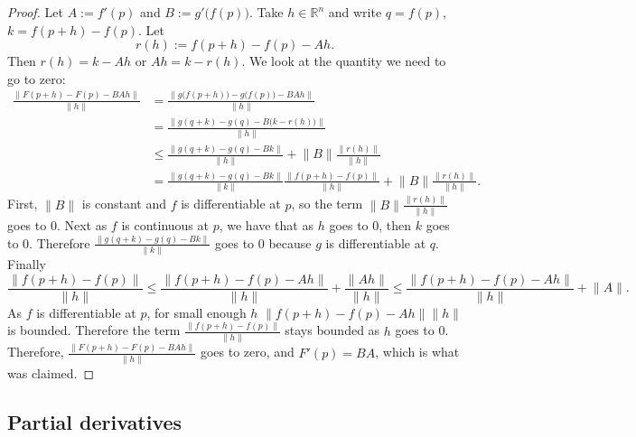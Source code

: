 \documentclass[12pt]{book}
\newcommand{\snorm}[1]{\lVert {#1} \rVert}
\newcommand{\R}{{\mathbb{R}}}
\theoremstyle{plain}
\theoremstyle{remark}
\theoremstyle{definition}
\theoremstyle{exercise}
\theoremstyle{example}
\begin{document}
\begin{proof}
Let $A := f'(p)$ and $B := g'\bigl(f(p)\bigr)$.  Take $h \in \R^n$
and write $q = f(p)$, $k = f(p+h)-f(p)$.  Let
\begin{equation*}
r(h) := f(p+h)-f(p) - A h . %
\end{equation*}
Then $r(h) = k-Ah$ or $Ah = k-r(h)$.  We look at the quantity we need to go
to zero:
\begin{equation*}
\begin{split}
\frac{\snorm{F(p+h)-F(p) - BAh}}{\snorm{h}}
& =
\frac{\snorm{g\bigl(f(p+h)\bigr)-g\bigl(f(p)\bigr) - BAh}}{\snorm{h}}
\\
& =
\frac{\snorm{g(q+k)-g(q) - B\bigl(k-r(h)\bigr)}}{\snorm{h}}
\\
& \leq
\frac
{\snorm{g(q+k)-g(q) - Bk}}
{\snorm{h}}
+
\snorm{B}
\frac
{\snorm{r(h)}}
{\snorm{h}}
\\
& =
\frac
{\snorm{g(q+k)-g(q) - Bk}}
{\snorm{k}}
\frac
{\snorm{f(p+h)-f(p)}}
{\snorm{h}}
+
\snorm{B}
\frac
{\snorm{r(h)}}
{\snorm{h}} .
\end{split}
\end{equation*}
First, $\snorm{B}$ is constant and $f$ is differentiable at $p$,
so
the term $\snorm{B}\frac{\snorm{r(h)}}{\snorm{h}}$ goes to 0.
Next as $f$ is continuous at $p$, we have that as 
$h$ goes to 0, then $k$ goes to 0.  Therefore
$\frac
{\snorm{g(q+k)-g(q) - Bk}}
{\snorm{k}}$ goes to 0 because $g$ is differentiable at $q$.
Finally 
\begin{equation*}
\frac
{\snorm{f(p+h)-f(p)}}
{\snorm{h}}
\leq
\frac
{\snorm{f(p+h)-f(p)-Ah}}
{\snorm{h}}
+
\frac
{\snorm{Ah}}
{\snorm{h}}
\leq
\frac
{\snorm{f(p+h)-f(p)-Ah}}
{\snorm{h}}
+
\snorm{A} .
\end{equation*}
As $f$ is differentiable at $p$,
for small enough $h$
${\snorm{f(p+h)-f(p)-Ah}}
{\snorm{h}}$ is bounded.  Therefore the
term
$
\frac
{\snorm{f(p+h)-f(p)}}
{\snorm{h}}
$
stays bounded as $h$ goes to 0.  Therefore, 
$\frac{\snorm{F(p+h)-F(p) - BAh}}{\snorm{h}}$ goes to zero, and
$F'(p) = BA$, which is what was claimed.
\end{proof}

\subsection{Partial derivatives}
\end{document}
